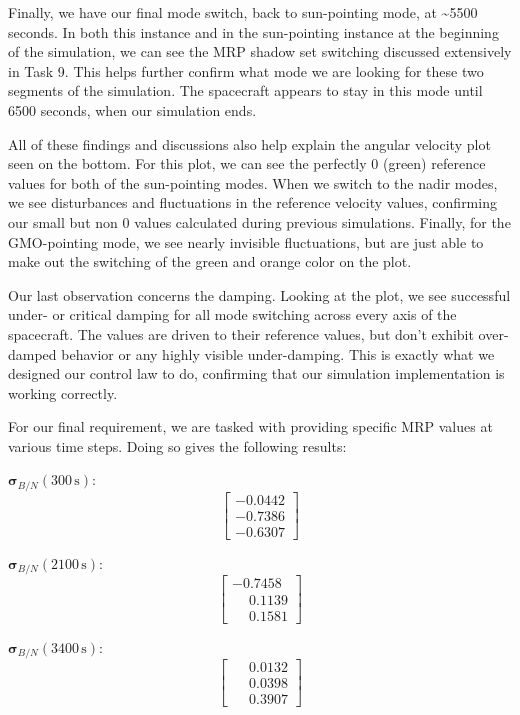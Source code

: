 \documentclass[conf]{new-aiaa}
\begin{document}
Finally, we have our final mode switch, back to sun-pointing mode, at \textasciitilde5500 seconds. In both this instance and in the sun-pointing instance at the beginning of the simulation, we can see the MRP shadow set switching discussed extensively in Task 9. This helps further confirm what mode we are looking for these two segments of the simulation. The spacecraft appears to stay in this mode until 6500 seconds, when our simulation ends. 

All of these findings and discussions also help explain the angular velocity plot seen on the bottom. For this plot, we can see the perfectly 0 (green) reference values for both of the sun-pointing modes. When we switch to the nadir modes, we see disturbances and fluctuations in the reference velocity values, confirming our small but non 0 values calculated during previous simulations. Finally, for the GMO-pointing mode, we see nearly invisible fluctuations, but are just able to make out the switching of the green and orange color on the plot. 

Our last observation concerns the damping. Looking at the plot, we see successful under- or critical damping for all mode switching across every axis of the spacecraft. The values are driven to their reference values, but don't exhibit over-damped behavior or any highly visible under-damping. This is exactly what we designed our control law to do, confirming that our simulation implementation is working correctly. 

For our final requirement, we are tasked with providing specific MRP values at various time steps. Doing so gives the following results:

$\bm{\sigma}_{B/N}(300\,\text{s})$:
\[
\begin{bmatrix}
-0.0442 \\
-0.7386 \\
-0.6307
\end{bmatrix}
\]

$\bm{\sigma}_{B/N}(2100\,\text{s})$:
\[
\begin{bmatrix}
-0.7458 \\
\phantom{-}0.1139 \\
\phantom{-}0.1581
\end{bmatrix}
\]

$\bm{\sigma}_{B/N}(3400\,\text{s})$:
\[
\begin{bmatrix}
\phantom{-}0.0132 \\
\phantom{-}0.0398 \\
\phantom{-}0.3907
\end{bmatrix}
\]
\end{document}
